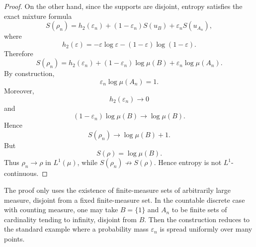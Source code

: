 \documentclass{techbrief}
\begin{document}
\begin{proof}
	On the other hand, since the supports are disjoint, entropy satisfies the exact mixture formula
	\begin{equation}
		S(\rho_n)
		=
		h_2(\varepsilon_n)
		+
		(1-\varepsilon_n)S(u_B)
		+
		\varepsilon_n S(u_{A_n}),
	\end{equation}
	where
	\begin{equation}
		h_2(\varepsilon)
		=
		-\varepsilon\log\varepsilon
		-
		(1-\varepsilon)\log(1-\varepsilon).
	\end{equation}
	Therefore
	\begin{equation}
		S(\rho_n)
		=
		h_2(\varepsilon_n)
		+
		(1-\varepsilon_n)\log\mu(B)
		+
		\varepsilon_n\log\mu(A_n).
	\end{equation}
	By construction,
	\begin{equation}
		\varepsilon_n\log\mu(A_n)=1.
	\end{equation}
	Moreover,
	\begin{equation}
		h_2(\varepsilon_n)\to0
	\end{equation}
	and
	\begin{equation}
		(1-\varepsilon_n)\log\mu(B)\to\log\mu(B).
	\end{equation}
	Hence
	\begin{equation}
		S(\rho_n)\to\log\mu(B)+1.
	\end{equation}
	But
	\begin{equation}
		S(\rho)=\log\mu(B).
	\end{equation}
	Thus $\rho_n\to\rho$ in $L^1(\mu)$, while $S(\rho_n)\not\to S(\rho)$. Hence entropy is not $L^1$-continuous.
\end{proof}

\begin{remark}
	The proof only uses the existence of finite-measure sets of arbitrarily large measure, disjoint from a fixed finite-measure set. In the countable discrete case with counting measure, one may take $B=\{1\}$ and $A_n$ to be finite sets of cardinality tending to infinity, disjoint from $B$. Then the construction reduces to the standard example where a probability mass $\varepsilon_n$ is spread uniformly over many points.
\end{remark}
\end{document}
